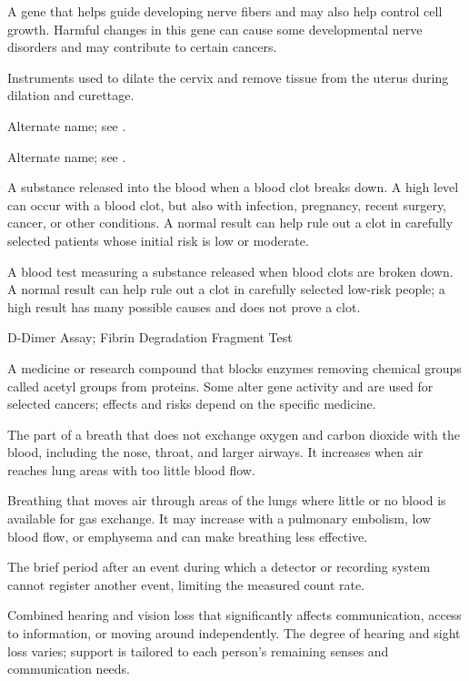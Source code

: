  A gene that helps guide developing nerve fibers and may also help control cell growth. Harmful changes in this gene can cause some developmental nerve disorders and may contribute to certain cancers.

 Instruments used to dilate the cervix and remove tissue from the uterus during dilation and curettage.

 Alternate name; see .

 Alternate name; see .

 A substance released into the blood when a blood clot breaks down. A high level can occur with a blood clot, but also with infection, pregnancy, recent surgery, cancer, or other conditions. A normal result can help rule out a clot in carefully selected patients whose initial risk is low or moderate.

 A blood test measuring a substance released when blood clots are broken down. A normal result can help rule out a clot in carefully selected low-risk people; a high result has many possible causes and does not prove a clot.

\synonyms
D-Dimer Assay; Fibrin Degradation Fragment Test

 A medicine or research compound that blocks enzymes removing chemical groups called acetyl groups from proteins. Some alter gene activity and are used for selected cancers; effects and risks depend on the specific medicine.

 The part of a breath that does not exchange oxygen and carbon dioxide with the blood, including the nose, throat, and larger airways. It increases when air reaches lung areas with too little blood flow.

 Breathing that moves air through areas of the lungs where little or no blood is available for gas exchange. It may increase with a pulmonary embolism, low blood flow, or emphysema and can make breathing less effective.

 The brief period after an event during which a detector or recording system cannot register another event, limiting the measured count rate.

 Combined hearing and vision loss that significantly affects communication, access to information, or moving around independently. The degree of hearing and sight loss varies; support is tailored to each person's remaining senses and communication needs.


